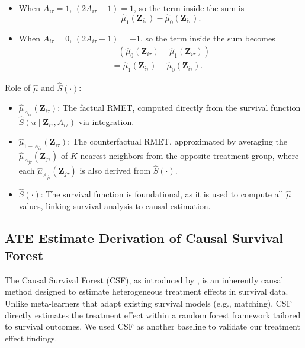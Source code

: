 \begin{enumerate}
\begin{itemize}
   \item When $ A_{i\tau} = 1 $, $ (2 A_{i\tau} - 1) = 1 $, so the term inside the sum is $$ \widehat{\mu}_{1}(\mathbf{Z}_{i\tau}) - \widehat{\mu}_{0}(\mathbf{Z}_{i\tau}). $$
   \item When $ A_{i\tau} = 0 $, $ (2 A_{i\tau} - 1) = -1 $, so the term inside the sum becomes 
   \begin{align*} -(\widehat{\mu}_{0}(\mathbf{Z}_{i\tau}) - \widehat{\mu}_{1}(\mathbf{Z}_{i\tau})) \\ = \widehat{\mu}_{1}(\mathbf{Z}_{i\tau}) - \widehat{\mu}_{0}(\mathbf{Z}_{i\tau}).
   \end{align*}
    \end{itemize}
\end{enumerate}

Role of $ \widehat{\mu} $ and $ \widehat{S}(\cdot) $:
\begin{itemize}
\item $ \widehat{\mu}_{A_{i\tau}}(\mathbf{Z}_{i\tau}) $: The factual RMET, computed directly from the survival function $ \widehat{S}(u \mid \mathbf{Z}_{i\tau}, A_{i\tau}) $ via integration.
\item $ \widehat{\mu}_{1 - A_{i\tau}}(\mathbf{Z}_{i\tau}) $: The counterfactual RMET, approximated by averaging the $ \widehat{\mu}_{A_{j\tau}}(\mathbf{Z}_{j\tau}) $ of $ K $ nearest neighbors from the opposite treatment group, where each $ \widehat{\mu}_{A_{j\tau}}(\mathbf{Z}_{j\tau}) $ is also derived from $ \widehat{S}(\cdot) $.
\item $ \widehat{S}(\cdot) $: The survival function is foundational, as it is used to compute all $ \widehat{\mu} $ values, linking survival analysis to causal estimation.
\end{itemize}

\subsection{ATE Estimate Derivation of Causal Survival Forest}
\label{apd:csf_ate_derivation}
The Causal Survival Forest (CSF), as introduced by \citet{cui2023estimating}, is an inherently causal method designed to estimate heterogeneous treatment effects in survival data. Unlike meta-learners that adapt existing survival models (e.g., matching), CSF directly estimates the treatment effect within a random forest framework tailored to survival outcomes. We used CSF as another baseline to validate our treatment effect findings.

